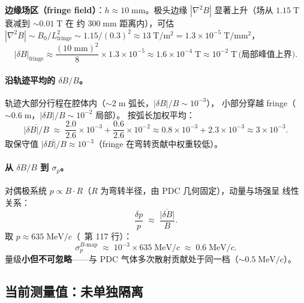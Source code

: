 \textbf{边缘场区（fringe field）}：$h \approx 10\;\mathrm{mm}$。极头边缘
$|\nabla^2 B|$ 显著上升（场从 $1.15\;\mathrm{T}$ 衰减到 $\sim 0.01\;\mathrm{T}$ 在
约 $300\;\mathrm{mm}$ 距离内），可估
$|\nabla^2 B| \sim B_0/L_\mathrm{fringe}^2 \sim 1.15/(0.3)^2 \approx 13\;\mathrm{T/m^2}
= 1.3\times 10^{-5}\;\mathrm{T/mm^2}$，
\begin{equation}
  |\delta B|_\mathrm{fringe} \approx \frac{(10\;\mathrm{mm})^2}{8}\times 1.3\times 10^{-5}
   \approx 1.6\times 10^{-4}\;\mathrm{T} \approx 10^{-2}\;\mathrm{T}\,\text{(局部峰值上界)}.
\end{equation}

\paragraph{沿轨迹平均的 $\delta B / B$。}
轨迹大部分行程在腔体内（$\sim 2\;\mathrm{m}$ 弧长，$|\delta B|/B \sim 10^{-3}$），
小部分穿越 fringe（$\sim 0.6\;\mathrm{m}$，$|\delta B|/B \sim 10^{-2}$ 局部）。
按弧长加权平均：
\begin{equation}
  \overline{|\delta B|/B} \;\approx\; \frac{2.0}{2.6}\times 10^{-3} + \frac{0.6}{2.6}\times 10^{-2}
   \approx 0.8\times 10^{-3} + 2.3\times 10^{-3}
   \approx 3\times 10^{-3}.
\end{equation}
取保守值 $\overline{|\delta B|/B} \approx 10^{-3}$（fringe 在弯转贡献中权重较低）。

\paragraph{从 $\delta B/B$ 到 $\sigma_p$。}
对偶极系统 $p \propto B \cdot R$（$R$ 为弯转半径，由 PDC 几何固定），动量与场强呈
线性关系：
\begin{equation}
  \frac{\delta p}{p} \;\approx\; \frac{\overline{|\delta B|}}{B}.
\end{equation}
取 $p \approx 635\;\mathrm{MeV}/c$（\StatusReport{}~第 117 行）：
\begin{equation}
  \sigma_p^{B\text{-map}} \;\approx\; 10^{-3}\times 635\;\mathrm{MeV}/c
   \;\approx\; 0.6\;\mathrm{MeV}/c.
\end{equation}
量级\textbf{小但不可忽略}——与 PDC 气体多次散射贡献处于同一档（$\sim 0.5\;\mathrm{MeV}/c$）。

\subsection{当前测量值：未单独隔离}
\label{sec:budget-bfield-current}

